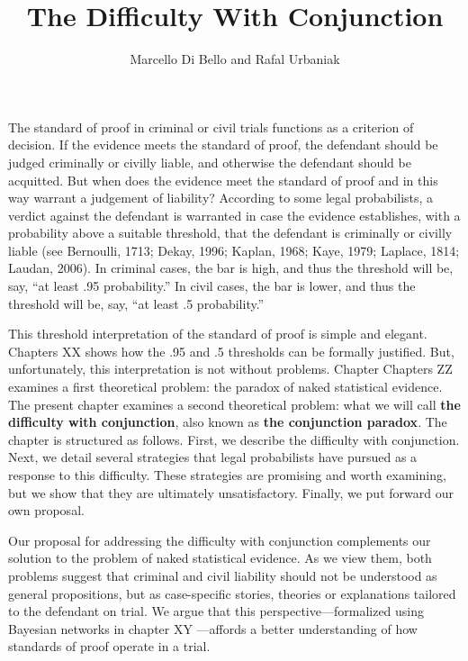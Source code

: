 \documentclass[
  10pt,
  dvipsnames,enabledeprecatedfontcommands]{scrartcl}
\title{The Difficulty With Conjunction}
\author{Marcello Di Bello and Rafal Urbaniak}
\date{}
\begin{document}
\maketitle

The standard of proof in criminal or civil trials functions as a
criterion of decision. If the evidence meets the standard of proof, the
defendant should be judged criminally or civilly liable, and otherwise
the defendant should be acquitted. But when does the evidence meet the
standard of proof and in this way warrant a judgement of liability?
According to some legal probabilists, a verdict against the defendant is
warranted in case the evidence establishes, with a probability above a
suitable threshold, that the defendant is criminally or civilly liable
(see Bernoulli, 1713; Dekay, 1996; Kaplan, 1968; Kaye, 1979; Laplace,
1814; Laudan, 2006). In criminal cases, the bar is high, and thus the
threshold will be, say, ``at least .95 probability.'' In civil cases,
the bar is lower, and thus the threshold will be, say, ``at least .5
probability.''

This threshold interpretation of the standard of proof is simple and
elegant. Chapters XX  shows how the .95
and .5 thresholds can be formally justified. But, unfortunately, this
interpretation is not without problems. Chapter Chapters ZZ
 examines a first theoretical problem:
the paradox of naked statistical evidence. The present chapter examines
a second theoretical problem: what we will call
\textbf{the difficulty with conjunction}, also known as
\textbf{the conjunction paradox}. The chapter is structured as follows.
First, we describe the difficulty with conjunction. Next, we detail
several strategies that legal probabilists have pursued as a response to
this difficulty. These strategies are promising and worth examining, but
we show that they are ultimately unsatisfactory. Finally, we put forward
our own proposal.

Our proposal for addressing the difficulty with conjunction complements
our solution to the problem of naked statistical evidence. As we view
them, both problems suggest that criminal and civil liability should not
be understood as general propositions, but as case-specific stories,
theories or explanations tailored to the defendant on trial. We argue
that this perspective---formalized using Bayesian networks in chapter XY
---affords a better understanding of how
standards of proof operate in a trial.
\end{document}
